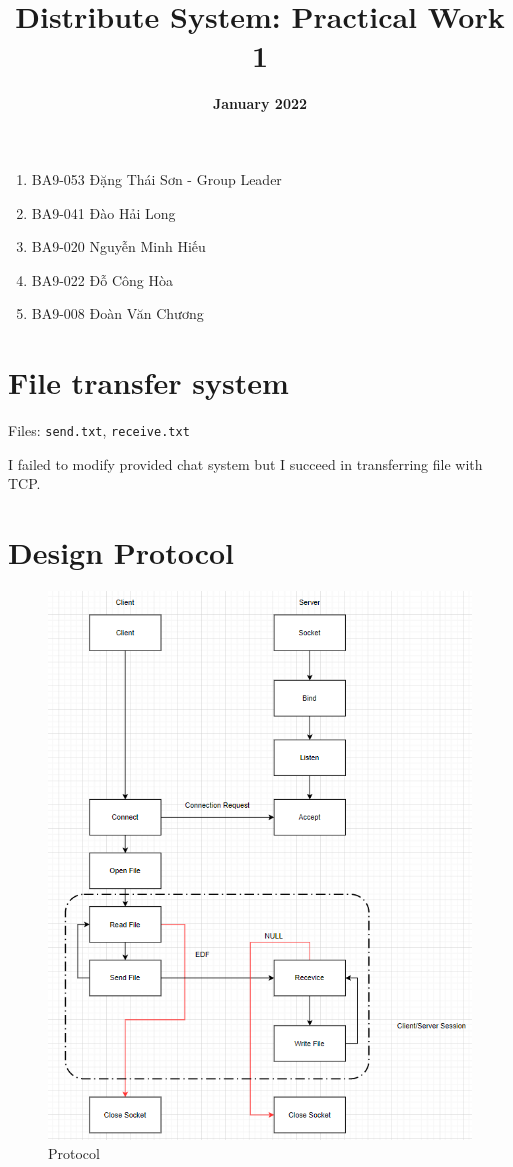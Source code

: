 \documentclass[11pt, a4paper]{article}
\title{\textbf{Distribute System: Practical Work 1 }}
\date{\textbf{January 2022}}
\begin{document}
\maketitle
\begin{enumerate}
  \item BA9-053 Đặng Thái Sơn - Group Leader
  \item BA9-041 Đào Hải Long 
  \item BA9-020 Nguyễn Minh Hiếu
  \item BA9-022 Đỗ Công Hòa
  \item BA9-008 Đoàn Văn Chương
\end{enumerate}
\section{File transfer system}
\hspace{1.5cm}
 Files: \texttt{send.txt}, \texttt{receive.txt}
 
\vspace{0.5cm}
I failed to modify provided chat system but I succeed in transferring file with TCP.
\vspace{2cm}

\section{Design Protocol}
\begin{figure}
    \includegraphics{Image/lab1.png}
    \caption{Protocol}
    \label{fig:my_label}
\end{figure}
\end{document}
